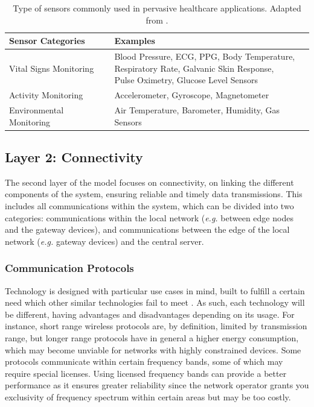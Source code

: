 \renewcommand{\arraystretch}{2}
\begin{table}[H]
    \centering
    \begin{tabular}{l|l}
        \textbf{Sensor Categories} & \textbf{Examples} \\ 
        \hline
        Vital Signs Monitoring & \makecell{Blood Pressure, \acs{ECG}, PPG, Body Temperature, \\ Respiratory Rate, Galvanic Skin Response, \\ Pulse Oximetry, Glucose Level Sensors} \\
        Activity Monitoring & Accelerometer, Gyroscope, Magnetometer\\
        Environmental Monitoring & Air Temperature, Barometer, Humidity, Gas Sensors \\
    \end{tabular}
    \caption[Type of sensors commonly used in pervasive healthcare applications.]{Type of sensors commonly used in pervasive healthcare applications. Adapted from \cite{MinhDang2019}.}
    \label{tab:layer1-sensors} 
\end{table}
\renewcommand{\arraystretch}{1}

\subsection{Layer 2: Connectivity}
\label{sec:iot-model-layer2}

The second layer of the model focuses on connectivity, on linking the different components of the system, ensuring reliable and timely data transmissions. This includes all communications within the system, which can be divided into two categories: communications within the local network (\textit{e.g.} between edge nodes and the gateway devices), and communications between the edge of the local network (\textit{e.g.} gateway devices) and the central server. \bigskip

\subsubsection{Communication Protocols}

Technology is designed with particular use cases in mind, built to fulfill a certain need which other similar technologies fail to meet \cite{Cisco2014}. As such, each technology will be different, having advantages and disadvantages depending on its usage. For instance, short range wireless protocols are, by definition, limited by transmission range, but longer range protocols have in general a higher energy consumption, which may become unviable for networks with highly constrained devices. Some protocols communicate within certain frequency bands, some of which may require special licenses. Using licensed frequency bands can provide a better performance as it ensures greater reliability since the network operator grants you exclusivity of frequency spectrum within certain areas but may be too costly. \bigskip

